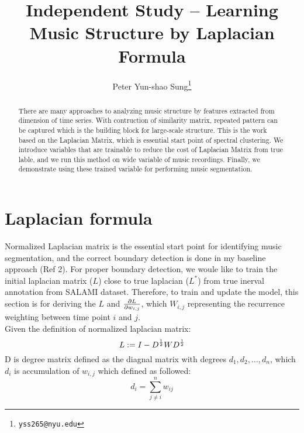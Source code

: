 \documentclass[final]{siamltexmm}
\title{Independent Study -- Learning Music Structure by Laplacian Formula}
\author{Peter Yun-shao Sung\thanks{\tt yss265@nyu.edu} }
\begin{document}
\maketitle

\begin{abstract}
There are many approaches to analyzing music structure by features extracted from dimension of time series. With contruction of similarity matrix, repeated pattern can be captured which is the building block for large-scale structure. This is the work based on the Laplacian Matrix, which is essential start point of spectral clustering. We introduce variables that are trainable to reduce the cost of Laplacian Matrix from true lable, and we run this method on wide variable of music recordings. Finally, we demonstrate using these trained variable for performing music segmentation.
\end{abstract}

\pagestyle{myheadings}
\thispagestyle{plain}

\section{Laplacian formula}
Normalized Laplacian matrix is the essential start point for identifying music segmentation, and the correct boundary detection is done in my baseline approach (Ref 2). For proper boundary detection, we woule like to train the initial laplacian matrix ($L$) close to true laplacian ($L^{\ast}$) from true inerval annotation from SALAMI dataset. Therefore, to train and update the model, this section is for deriving the $L$ and ${\partial L \over \partial w_{i,j}}$, which $W_{i,j}$ representing the recurrence weighting between time point $i$ and $j$.\\
Given the definition of normalized laplacian matrix:
\begin{equation}
L := I - D^{1 \over 2}W D^{1 \over 2}
\end{equation}
D is degree matrix defined as the diagnal matrix with degrees $d_1, d_2, \ldots, d_n$, which $d_i$ is accumulation of $w_{i,j}$ which defined as followed:
\begin{equation}
d_i = \displaystyle\sum_{j \neq i}^{n} w_{ij}
\end{equation}
\end{document}
